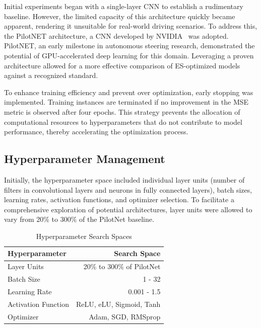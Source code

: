 \documentclass[conference]{IEEEtran}
\begin{document}
Initial experiments began with a single-layer CNN to establish a rudimentary baseline. However, the limited capacity of this architecture quickly became apparent, rendering it unsuitable for real-world driving scenarios. To address this, the PilotNET architecture, a CNN developed by NVIDIA~\cite{PilotNET} was adopted. PilotNET, an early milestone in autonomous steering research, demonstrated the potential of GPU-accelerated deep learning for this domain. Leveraging a proven architecture allowed for a more effective comparison of ES-optimized models against a recognized standard.

To enhance training efficiency and prevent over optimization, early stopping was implemented. Training instances are terminated if no improvement in the MSE metric is observed after four epochs. This strategy prevents the allocation of computational resources to hyperparameters that do not contribute to model performance, thereby accelerating the optimization process.

\subsection{Hyperparameter Management}

Initially, the hyperparameter space included individual layer units (number of filters in convolutional layers and neurons in fully connected layers), batch sizes, learning rates, activation functions, and optimizer selection. To facilitate a comprehensive exploration of potential architectures, layer units were allowed to vary from 20\% to 300\% of the PilotNet baseline.

\begin{table}[ht]
    \centering
    \caption{Hyperparameter Search Spaces}
    \begin{tabular}{l|r}
        \textbf{Hyperparameter} & \textbf{Search Space}     \\
        \hline
        Layer Units             & 20\% to 300\% of PilotNet \\
        Batch Size              & 1 - 32                    \\
        Learning Rate           & 0.001 - 1.5               \\
        Activation Function     & ReLU, eLU, Sigmoid, Tanh  \\
        Optimizer               & Adam, SGD, RMSprop        \\
    \end{tabular}
    \label{tab:searchspace}
\end{table}
\end{document}
